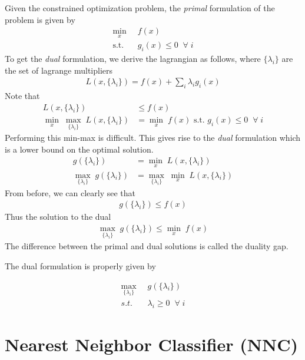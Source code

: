 \documentclass[11pt]{article}
\begin{document}
Given the constrained optimization problem, the {\it primal} formulation of the problem is given by
\begin{align*}
\min_{x} \;\;& f(x)\\
\text{s.t.} \;\; & g_i(x) \le 0 \; \;\forall \; i
\end{align*}
To get the {\it dual} formulation, we derive the lagrangian as follows, where $\{\lambda_i\}$ are the set of lagrange multipliers
\begin{align*}
L(x,\{\lambda_i\}) = f(x) + \sum_i \lambda_i g_i(x)
\end{align*}
Note that 
\begin{align*}
L(x,\{\lambda_i\}) & \le f(x)\\
\min_{x} \;\max_{\{\lambda_i\}} \;L(x,\{\lambda_i\}) & = \min_{x} \;f(x) \text{ s.t. } g_i(x) \le 0 \; \;\forall \; i
\end{align*}
Performing this min-max is difficult. This gives rise to the {\it dual} formulation which is a lower bound on the optimal solution.
\begin{align*}
g(\{\lambda_i\}) &= \min_{x} \;L(x,\{\lambda_i\})\\
\max_{\{\lambda_i\}} \;g(\{\lambda_i\}) &= \max_{\{\lambda_i\}} \;\min_{x} \;L(x,\{\lambda_i\})
\end{align*}
From before, we can clearly see that
\begin{align*}
g(\{\lambda_i\}) \le f(x)
\end{align*}
Thus the solution to the dual
\begin{align*}
\max_{\{\lambda_i\}} \;g(\{\lambda_i\}) \le \min_{x} \; f(x)
\end{align*}
The difference between the primal and dual solutions is called the duality gap.

The dual formulation is properly given by

\begin{align*}
\max_{\{\lambda_i\}} \;\;& g(\{\lambda_i\})\\
s.t. \;\; & \lambda_i \ge 0 \; \;\forall \; i
\end{align*}

\section{Nearest Neighbor Classifier (NNC)}
\end{document}
